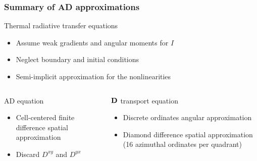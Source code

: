 \documentclass{beamer}
\newcommand{\Dtens}{\mat{D}}
\begin{document}
\begin{frame}
  \frametitle{Summary of AD approximations}
  \begin{block}{Thermal radiative transfer equations}
    \begin{itemize}
      \item Assume weak gradients and angular moments for $I$
      \item Neglect boundary and initial conditions
      \item Semi-implicit approximation for the nonlinearities
    \end{itemize}
  \end{block}
  \begin{columns}[t]
    \begin{column}{.48\textwidth}
  \begin{block}{AD equation}
    \begin{itemize}
      \item Cell-centered finite difference spatial approximation
      \item Discard $D^{xy}$ and $D^{yx}$
    \end{itemize}
  \end{block}
    \end{column}
    \begin{column}{.48\textwidth}
  \begin{block}{$\Dtens$ transport equation}
    \begin{itemize}
      \item Discrete ordinates angular approximation
      \item Diamond difference spatial approximation (16 azimuthal ordinates
        per quadrant)
    \end{itemize}
  \end{block}
    \end{column}
  \end{columns}
\end{frame}

\end{document}
